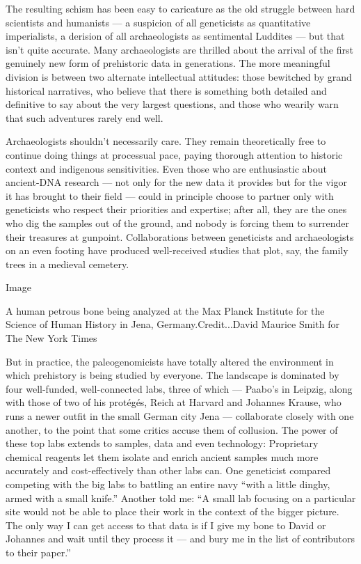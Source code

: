 The resulting schism has been easy to caricature as the old struggle
between hard scientists and humanists --- a suspicion of all geneticists
as quantitative imperialists, a derision of all archaeologists as
sentimental Luddites --- but that isn't quite accurate. Many
archaeologists are thrilled about the arrival of the first genuinely new
form of prehistoric data in generations. The more meaningful division is
between two alternate intellectual attitudes: those bewitched by grand
historical narratives, who believe that there is something both detailed
and definitive to say about the very largest questions, and those who
wearily warn that such adventures rarely end well.

Archaeologists shouldn't necessarily care. They remain theoretically
free to continue doing things at processual pace, paying thorough
attention to historic context and indigenous sensitivities. Even those
who are enthusiastic about ancient-DNA research --- not only for the new
data it provides but for the vigor it has brought to their field ---
could in principle choose to partner only with geneticists who respect
their priorities and expertise; after all, they are the ones who dig the
samples out of the ground, and nobody is forcing them to surrender their
treasures at gunpoint. Collaborations between geneticists and
archaeologists on an even footing have produced well-received studies
that plot, say, the family trees in a medieval cemetery.

Image

A human petrous bone being analyzed at the Max Planck Institute for the
Science of Human History in Jena, Germany.Credit...David Maurice Smith
for The New York Times

But in practice, the paleogenomicists have totally altered the
environment in which prehistory is being studied by everyone. The
landscape is dominated by four well-funded, well-connected labs, three
of which --- Paabo's in Leipzig, along with those of two of his
protégés, Reich at Harvard and Johannes Krause, who runs a newer outfit
in the small German city Jena --- collaborate closely with one another,
to the point that some critics accuse them of collusion. The power of
these top labs extends to samples, data and even technology: Proprietary
chemical reagents let them isolate and enrich ancient samples much more
accurately and cost-effectively than other labs can. One geneticist
compared competing with the big labs to battling an entire navy ``with a
little dinghy, armed with a small knife.'' Another told me: ``A small
lab focusing on a particular site would not be able to place their work
in the context of the bigger picture. The only way I can get access to
that data is if I give my bone to David or Johannes and wait until they
process it --- and bury me in the list of contributors to their paper.''

